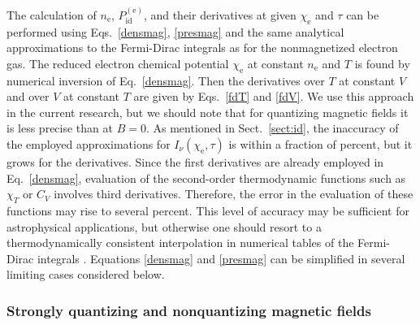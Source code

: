 \documentclass[traditabstract]{aa}
\newcommand{\req}[1]{Eq.~\ref{#1}}
\newcommand{\chie}{\chi_\mathrm{e}}
\newcommand{\nel}{n_\mathrm{e}}
\begin{document}
The calculation of $\nel$, $P_\mathrm{id}^\mathrm{(e)}$,
and their derivatives at given $\chie$ and $\tau$ can be
performed using Eqs.~\ref{densmag}, \ref{presmag} and
the same analytical approximations to the Fermi-Dirac
integrals as for the nonmagnetized electron gas. The reduced
electron chemical potential $\chie$ at constant $\nel$ and
$T$ is found by numerical inversion of \req{densmag}.
Then the derivatives over $T$ at constant $V$ and over
$V$ at constant $T$ are given by Eqs.~\ref{fdT} and
\ref{fdV}. We use this approach in the current research,
but we should note that for quantizing magnetic fields it is
less precise than at $B=0$. As mentioned in
Sect.~\ref{sect:id}, the inaccuracy of the employed
approximations for $I_\nu(\chie,\tau)$ is within a fraction
of percent, but it grows for the derivatives. Since the
first derivatives are already employed in \req{densmag},
evaluation of the second-order thermodynamic functions such
as $\chi_T$ or $C_V$ involves third derivatives. Therefore,
the error in the evaluation of these functions may rise to
several percent. This level of accuracy may be sufficient for
astrophysical applications, but otherwise one should resort
to a thermodynamically consistent interpolation in numerical
tables of the Fermi-Dirac integrals
\citep{TimmesArnett,TimmesSwesty}.
Equations \ref{densmag} and \ref{presmag} can be
simplified in several limiting cases considered
below. 

\subsubsection{Strongly quantizing and nonquantizing
magnetic fields}
\end{document}
